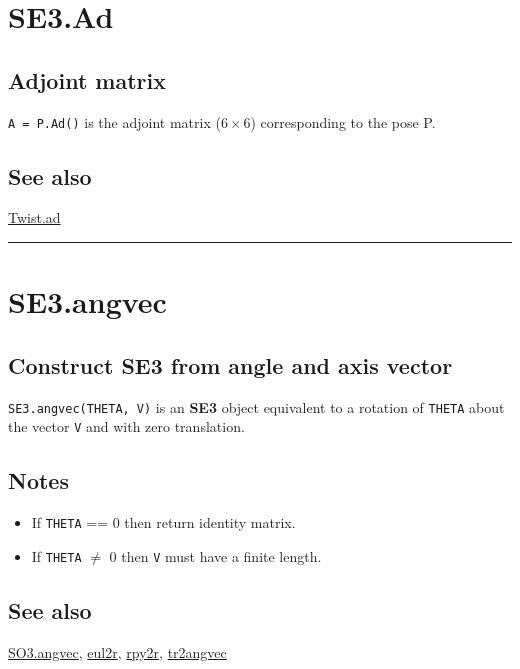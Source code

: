 \hypertarget{SE3.Ad}{\section*{SE3.Ad}}
\subsection*{Adjoint matrix}


\texttt{A = P.Ad()} is the adjoint matrix ($6 \times 6$) corresponding to the pose P.


\subsection*{See also}


\hyperlink{Twist.ad}{\color{blue} Twist.ad}

\vspace{1.5ex}\hrule

\hypertarget{SE3.angvec}{\section*{SE3.angvec}}
\subsection*{Construct SE3 from angle and axis vector}


\texttt{SE3.angvec(THETA, V)} is an \textbf{\color{red} SE3} object equivalent to a rotation of \texttt{THETA}
about the vector \texttt{V} and with zero translation.


\subsection*{Notes}
\begin{itemize}
  \item If \texttt{THETA} == 0 then return identity matrix.
  \item If \texttt{THETA} $\ne$ 0 then \texttt{V} must have a finite length.
\end{itemize}

\subsection*{See also}


\hyperlink{SO3.angvec}{\color{blue} SO3.angvec}, \hyperlink{eul2r}{\color{blue} eul2r}, \hyperlink{rpy2r}{\color{blue} rpy2r}, \hyperlink{tr2angvec}{\color{blue} tr2angvec}

